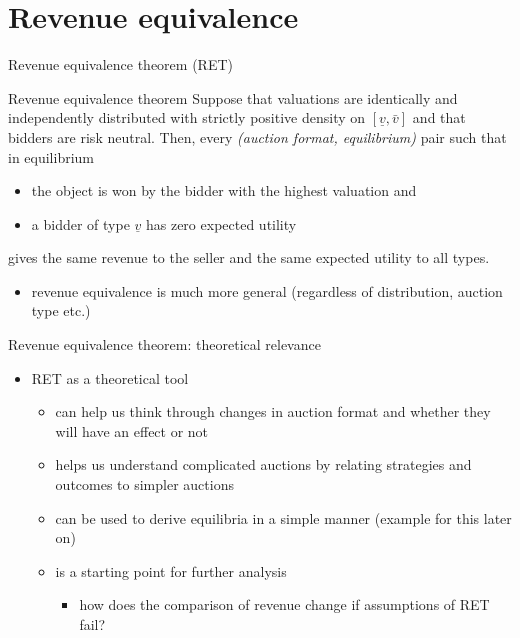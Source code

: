 \documentclass[bigger]{beamer}
\begin{document}
\section{Revenue equivalence}
\label{sec:orgaff8e3c}
\begin{frame}[label={sec:org8c79933}]{Revenue equivalence theorem (RET)}
\begin{block}{Revenue equivalence theorem}
Suppose that valuations are identically and independently distributed with strictly positive density on \([\underline v,\bar v]\) and that bidders are risk neutral.\linebreak
Then, every \emph{(auction format, equilibrium)} pair such that in equilibrium
\begin{itemize}
\item the object is won by the bidder with the highest valuation and
\item a bidder of type \(\underline v\) has zero expected utility
\end{itemize}
gives the same revenue to the seller and the same expected utility to all types.
\end{block}

\begin{itemize}
\item revenue equivalence is much more general (regardless of distribution, auction type etc.)
\end{itemize}
\end{frame}

\begin{frame}[label={sec:org1f05b00}]{Revenue equivalence theorem: theoretical relevance}
\begin{itemize}
\item RET as a theoretical tool
\begin{itemize}
\item can help us think through changes in auction format and whether they will have an effect or not
\item helps us understand complicated auctions by relating strategies and outcomes to simpler auctions
\item can be used to derive equilibria in a simple manner (example for this later on)
\item is a starting point for further analysis
\begin{itemize}
\item how does the comparison of revenue change if assumptions of RET fail?
\end{itemize}
\end{itemize}
\end{itemize}
\end{frame}
\end{document}
